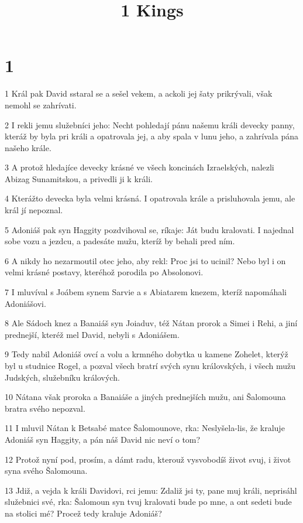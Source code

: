 

\title{1 Kings}

\chapter{1}

\par 1 Král pak David sstaral se a sešel vekem, a ackoli jej šaty prikrývali, však nemohl se zahrívati.
\par 2 I rekli jemu služebníci jeho: Necht pohledají pánu našemu králi devecky panny, kteráž by byla pri králi a opatrovala jej, a aby spala v lunu jeho, a zahrívala pána našeho krále.
\par 3 A protož hledajíce devecky krásné ve všech koncinách Izraelských, nalezli Abizag Sunamitskou, a privedli ji k králi.
\par 4 Kterážto devecka byla velmi krásná. I opatrovala krále a prisluhovala jemu, ale král jí nepoznal.
\par 5 Adoniáš pak syn Haggity pozdvihoval se, ríkaje: Ját budu kralovati. I najednal sobe vozu a jezdcu, a padesáte mužu, kteríž by behali pred ním.
\par 6 A nikdy ho nezarmoutil otec jeho, aby rekl: Proc jsi to ucinil? Nebo byl i on velmi krásné postavy, kteréhož porodila po Absolonovi.
\par 7 I mluvíval s Joábem synem Sarvie a s Abiatarem knezem, kteríž napomáhali Adoniášovi.
\par 8 Ale Sádoch knez a Banaiáš syn Joiaduv, též Nátan prorok a Simei i Rehi, a jiní prednejší, kteréž mel David, nebyli s Adoniášem.
\par 9 Tedy nabil Adoniáš ovcí a volu a krmného dobytka u kamene Zohelet, kterýž byl u studnice Rogel, a pozval všech bratrí svých synu královských, i všech mužu Judských, služebníku králových.
\par 10 Nátana však proroka a Banaiáše a jiných prednejších mužu, ani Šalomouna bratra svého nepozval.
\par 11 I mluvil Nátan k Betsabé matce Šalomounove, rka: Neslyšela-lis, že kraluje Adoniáš syn Haggity, a pán náš David nic neví o tom?
\par 12 Protož nyní pod, prosím, a dámt radu, kterouž vysvobodíš život svuj, i život syna svého Šalomouna.
\par 13 Jdiž, a vejda k králi Davidovi, rci jemu: Zdaliž jsi ty, pane muj králi, neprisáhl služebnici své, rka: Šalomoun syn tvuj kralovati bude po mne, a ont sedeti bude na stolici mé? Procež tedy kraluje Adoniáš?
